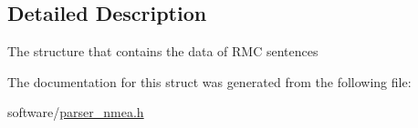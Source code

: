 \subsection{Detailed Description}
The structure that contains the data of R\+MC sentences 

The documentation for this struct was generated from the following file\+:\begin{DoxyCompactItemize}
\item 
software/\hyperlink{parser__nmea_8h}{parser\+\_\+nmea.\+h}\end{DoxyCompactItemize}
